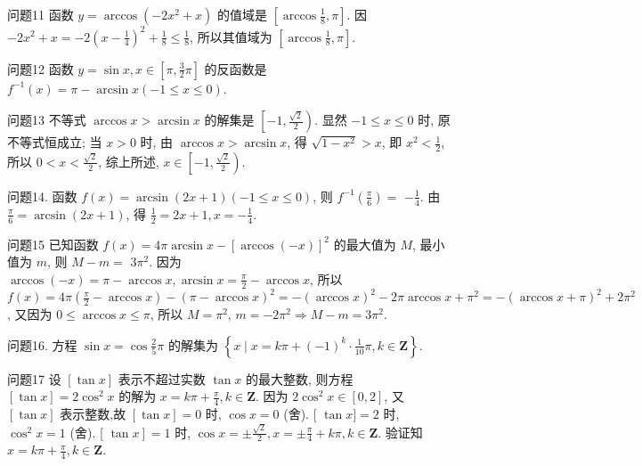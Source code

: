 问题11 函数 $y=\arccos \left(-2 x^2+x\right)$ 的值域是
$\left[\arccos \frac{1}{8}, \pi\right]$. 因 $-2 x^2+x=-2\left(x-\frac{1}{4}\right)^2+\frac{1}{8} \leqslant \frac{1}{8}$, 所以其值域为 $\left[\arccos \frac{1}{8}, \pi\right]$.



问题12 函数 $y=\sin x, x \in\left[\pi, \frac{3}{2} \pi\right]$ 的反函数是
$f^{-1}(x)=\pi-\arcsin x(-1 \leqslant x \leqslant 0)$.



问题13 不等式 $\arccos x>\arcsin x$ 的解集是
$\left[-1, \frac{\sqrt{2}}{2}\right)$. 显然 $-1 \leqslant x \leqslant 0$ 时, 原不等式恒成立; 当 $x>0$ 时, 由 $\arccos x>\arcsin x$, 得 $\sqrt{1-x^2}>x$, 即 $x^2<\frac{1}{2}$, 所以 $0<x<\frac{\sqrt{2}}{2}$, 综上所述, $x \in\left[-1, \frac{\sqrt{2}}{2}\right)$.



问题14. 函数 $f(x)=\arcsin (2 x+1)(-1 \leqslant x \leqslant 0)$, 则 $f^{-1}\left(\frac{\pi}{6}\right)=$
$-\frac{1}{4}$. 由 $\frac{\pi}{6}=\arcsin (2 x+1)$, 得 $\frac{1}{2}=2 x+1, x=-\frac{1}{4}$.



问题15 已知函数 $f(x)=4 \pi \arcsin x-[\arccos (-x)]^2$ 的最大值为 $M$, 最小值为 $m$, 则 $M-m=$
$3 \pi^2$. 因为 $\arccos (-x)=\pi-\arccos x, \arcsin x=\frac{\pi}{2}-\arccos x$, 所以 $f(x)=4 \pi\left(\frac{\pi}{2}-\arccos x\right)-(\pi-\arccos x)^2=-(\arccos x)^2-2 \pi \arccos x+ \pi^2=-(\arccos x+\pi)^2+2 \pi^2$, 又因为 $0 \leqslant \arccos x \leqslant \pi$, 所以 $M=\pi^2$,
$m=-2 \pi^2 \Rightarrow M-m=3 \pi^2$.



问题16. 方程 $\sin x=\cos \frac{2}{5} \pi$ 的解集为
$\left\{x \mid x=k \pi+(-1)^k \cdot \frac{1}{10} \pi, k \in \mathbf{Z}\right\}$.



问题17 设 $[\tan x]$ 表示不超过实数 $\tan x$ 的最大整数, 则方程 $[\tan x]=2 \cos ^2 x$ 的解为
$x=k \pi+\frac{\pi}{4}, k \in \mathbf{Z}$. 因为 $2 \cos ^2 x \in[0,2]$, 又 $[\tan x]$ 表示整数,故 $[\tan x]=0$ 时, $\cos x=0$ (舍). [ $\tan x]=2$ 时, $\cos ^2 x=1$ (舍). [ $\left.\tan x\right]=1$ 时, $\cos x= \pm \frac{\sqrt{2}}{2}, x= \pm \frac{\pi}{4}+k \pi, k \in \mathbf{Z}$. 验证知 $x=k \pi+\frac{\pi}{4}, k \in \mathbf{Z}$.



